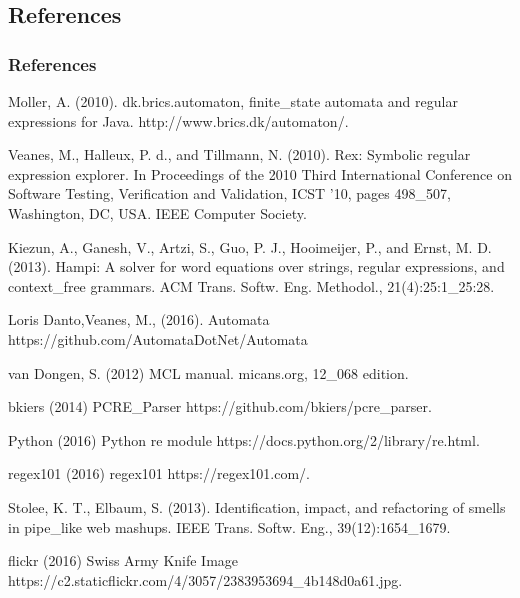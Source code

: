\subsection{References}



\begin{frame}[allowframebreaks]
\frametitle{References}
\footnotesize{
\begin{thebibliography}{99}

 Moller, A. (2010).
\newblock dk.brics.automaton, finite\_state automata and regular expressions for Java.
\newblock http://www.brics.dk/automaton/.

 Veanes, M., Halleux, P. d., and Tillmann, N. (2010).
\newblock Rex: Symbolic regular expression explorer.
\newblock In Proceedings of the 2010 Third International Conference on Software Testing, Verification and Validation, ICST ’10, pages 498\_507, Washington, DC, USA. IEEE Computer Society.

 Kiezun, A., Ganesh, V., Artzi, S., Guo, P. J., Hooimeijer, P., and Ernst, M. D. (2013).
\newblock Hampi: A solver for word equations over strings, regular expressions, and context\_free grammars.
\newblock ACM Trans. Softw. Eng. Methodol., 21(4):25:1\_25:28.

 Loris Danto,Veanes, M., (2016).
\newblock Automata
\newblock https://github.com/AutomataDotNet/Automata

 van Dongen, S. (2012)
\newblock MCL manual.
\newblock micans.org, 12\_068 edition.

 bkiers (2014)
\newblock PCRE\_Parser
\newblock https://github.com/bkiers/pcre\_parser.

 Python (2016)
\newblock Python re module
\newblock https://docs.python.org/2/library/re.html.

 regex101 (2016)
\newblock regex101
\newblock https://regex101.com/.

 Stolee, K. T., Elbaum, S. (2013).
\newblock Identification, impact, and refactoring of smells in pipe\_like web mashups.
\newblock IEEE Trans. Softw. Eng., 39(12):1654\_1679.


 flickr (2016)
\newblock Swiss Army Knife Image
\newblock https://c2.staticflickr.com/4/3057/2383953694\_4b148d0a61.jpg.


\end{thebibliography}}
\end{frame}
